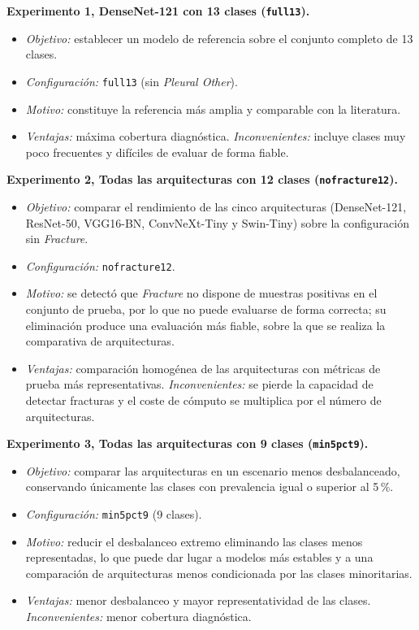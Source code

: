 \textbf{Experimento 1, DenseNet-121 con 13 clases (\texttt{full13}).}
\begin{itemize}
  \item \textit{Objetivo:} establecer un modelo de referencia sobre el conjunto
        completo de 13 clases.
  \item \textit{Configuración:} \texttt{full13} (sin \textit{Pleural Other}).
  \item \textit{Motivo:} constituye la referencia más amplia y comparable con la
        literatura.
  \item \textit{Ventajas:} máxima cobertura diagnóstica. \textit{Inconvenientes:}
        incluye clases muy poco frecuentes y difíciles de evaluar de forma
        fiable.
\end{itemize}

\textbf{Experimento 2, Todas las arquitecturas con 12 clases (\texttt{nofracture12}).}
\begin{itemize}
  \item \textit{Objetivo:} comparar el rendimiento de las cinco arquitecturas
        (DenseNet-121, ResNet-50, VGG16-BN, ConvNeXt-Tiny y Swin-Tiny) sobre la
        configuración sin \textit{Fracture}.
  \item \textit{Configuración:} \texttt{nofracture12}.
  \item \textit{Motivo:} se detectó que \textit{Fracture} no dispone de muestras
        positivas en el conjunto de prueba, por lo que no puede evaluarse de forma
        correcta; su eliminación produce una evaluación más fiable, sobre la que se
        realiza la comparativa de arquitecturas.
  \item \textit{Ventajas:} comparación homogénea de las arquitecturas con métricas
        de prueba más representativas. \textit{Inconvenientes:} se pierde la
        capacidad de detectar fracturas y el coste de cómputo se multiplica por el
        número de arquitecturas.
\end{itemize}

\textbf{Experimento 3, Todas las arquitecturas con 9 clases (\texttt{min5pct9}).}
\begin{itemize}
  \item \textit{Objetivo:} comparar las arquitecturas en un escenario menos
        desbalanceado, conservando únicamente las clases con prevalencia igual o
        superior al 5\,\%.
  \item \textit{Configuración:} \texttt{min5pct9} (9 clases).
  \item \textit{Motivo:} reducir el desbalanceo extremo eliminando las clases
        menos representadas, lo que puede dar lugar a modelos más estables y a una
        comparación de arquitecturas menos condicionada por las clases
        minoritarias.
  \item \textit{Ventajas:} menor desbalanceo y mayor representatividad de las
        clases. \textit{Inconvenientes:} menor cobertura diagnóstica.
\end{itemize}



